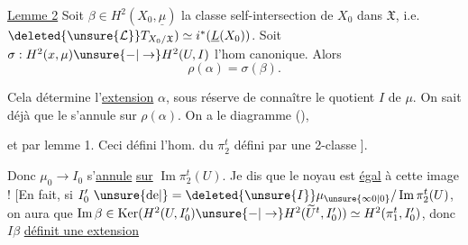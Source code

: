 
\uline{Lemme 2} Soit $\beta\in H^2(X_0,\underline\mu)$ la classe self-intersection de $X_0$ dans $\mathfrak X$, i.e.  $\deleted{\unsure{\mathcal L}}T_{X_0/\mathfrak X})\simeq i^*(\underline L(X_0))$. Soit $\sigma:H^2(x,\mu)\unsure{-|\to}H^2(U,I)$ l'hom canonique. Alors
\[
 \rho(\alpha)=\sigma(\beta).
\]

Cela détermine l'\uline{extension} $\alpha$, sous réserve de connaître le quotient $I$ de $\mu$. On sait déjà que le 
s'annule sur $\rho(\alpha)$. On a le diagramme (),

et par lemme 1. Ceci  \unsure{---} défini l'hom.  du $\pi_2^t$ défini par une 2-classe ].

Donc  $\mu_0\to I_0$ s'\uline{annule} \uline{sur} $\operatorname{Im}\pi_2^t(U)$. Je dis que  le noyau
est \uline{égal} à cette image ! [En fait, si $I'_0\ \unsure{\mathrm{de}|{}}=\deleted{\unsure{I}}\mu_{\unsure{\infty0|0}}/\operatorname{Im}\pi_2^t(U)$, on aura que $\operatorname{Im}\beta\in\operatorname{Ker}(H^2(U,I'_0)\unsure{-|\to}H^2(\widetilde U^t,I'_0))\simeq H^2(\pi_1^t,I'_0)$, donc $I\beta$ \uline{définit une extension}
